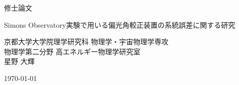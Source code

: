 \documentclass[../../main.tex]{subfiles}
\begin{document}
\begin{titlepage}
    \begin{center}
        \vspace*{5cm}

        \Large{修士論文}\\

        \vspace{0.2cm}

        \huge{Simons Observatory実験で用いる偏光角較正装置の系統誤差に関する研究}\\

        \vspace{1.5cm}

        \Large{京都大学大学院理学研究科 物理学・宇宙物理学専攻\\
        物理学第二分野 高エネルギー物理学研究室\\
        星野 大輝}

        \vspace{1cm}
        \today

        \vspace{2cm}

    \end{center}
\end{titlepage}
\end{document}
